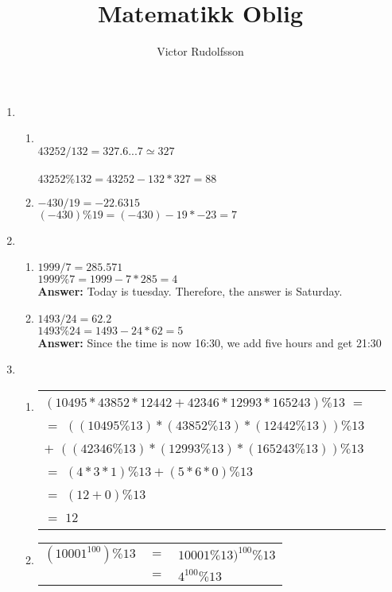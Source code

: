\documentclass[8pt,a4paper]{article}
\author{Victor Rudolfsson}
\title{Matematikk Oblig}
\begin{document}
\begin{enumerate}[itemsep=20pt]
\item
	\begin{enumerate}
		\item 
				\\
				$43252/132=327.6...7≃327$\\
				\\
				$43252\%132=43252-132*327=88$ \hfill
		\item
				$-430/19=-22.6315$\\
				$(-430)\%19=(-430)-19*-23=7$\\
	\end{enumerate}
\item
	\begin{enumerate}
		\item
				$1999/7=285.571$\\
				$1999\%7=1999-7*285=4$\\
				\textbf{Answer: } Today is tuesday. Therefore, the answer is Saturday.\\
		\item
				$1493/24=62.2$\\
				$1493\%24=1493-24*62=5$\\
				\textbf{Answer: } Since the time is now 16:30, we add five hours and get 21:30
	\end{enumerate}
\item
	\begin{enumerate}
		\item
			\begin{tabular}[t]{l r}
			\((10495*43852*12442 + 42346*12993*165243)\%13\) \(=\) &\\
															 \(=\) \(((10495\%13)*(43852\%13)*(12442\%13))\%13\) \\
															 \(+\) \(((42346\%13)*(12993\%13)*(165243\%13))\%13\) \\
															 \(=\) \((4*3*1)\%13 + (5*6*0)\%13\)\\
															 \(=\) \((12+0)\%13\)\\
															 \(=\) \(12\)\\
			\end{tabular}
		\item
			\begin{tabular}[t]{ r c l}
			\( (10001^{100})\%13\) & \(=\) & \(10001\%13)^{100}\%13\) \\
								 & \(=\) & \(4^{100}\%13 \) \\

\end{tabular}
\end{enumerate}
\end{enumerate}
\end{document}
